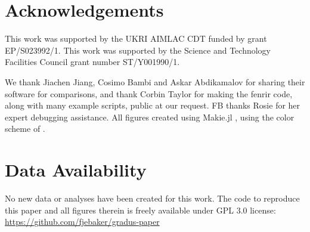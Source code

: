 \documentclass[fleqn,usenatbib]{mnras}
\newcommand{\software}[1]{{\sc #1}}
\begin{document}
\section*{Acknowledgements}
This work was supported by the UKRI AIMLAC CDT funded by grant EP/S023992/1. This
work was supported by the Science and Technology Facilities Council grant number
ST/Y001990/1.

We thank Jiachen Jiang, Cosimo Bambi and Askar Abdikamalov for sharing their
software for comparisons, and thank Corbin Taylor for making the \software{fenrir}
code, along with many example scripts, public at our request. FB thanks Rosie
for her expert debugging assistance. All figures created using Makie.jl
\citep{DanischKrumbiegel2021}, using the color scheme of
\citet{wong_points_2011}.

\section*{Data Availability}

No new data or analyses have been created for this work. The code to reproduce
this paper and all figures therein is freely available under GPL 3.0 license:
\url{https://github.com/fjebaker/gradus-paper}










\appendix



% 
% 
% 
% 




\bsp    %
\label{lastpage}
\end{document}
